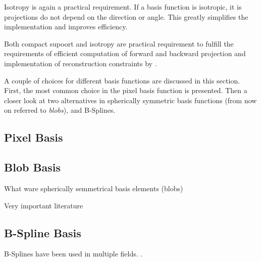 Isotropy is again a practical requirement. If a basis function is isotropic, it is projections do
not depend on the direction or angle. This greatly simplifies the implementation and improves
efficiency.

Both compact supoort and isotropy are practical requirement to fulfill the requirements of efficient
computation of forward and backward projection and implementation of reconstruction constraints by
\cite{hanson_local_1985}.

A couple of choices for different basis functions are discussed in this section. First, the most
common choice in the pixel basis function is presented. Then a closer look at two alternatives in
spherically symmetric basis functions (from now on referred to \textit{blobs}), and B-Splines.

\subsection{Pixel Basis}



\subsection{Blob Basis}

What ware spherically semmetrical basis elements (blobs)

Very important literature
\cite{lewitt_alternatives_1992}
\cite{matej_practical_1996}

\subsection{B-Spline Basis}

B-Splines have been used in multiple fields. .

